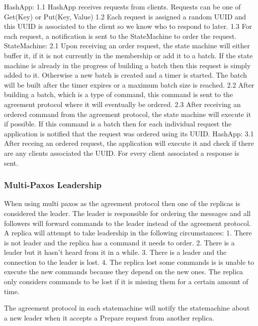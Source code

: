 \documentclass[sigconf]{acmart}
\begin{document}
HashApp:
1.1 HashApp receives requests from clients.
    Requests can be one of Get(Key) or Put(Key, Value)
1.2 Each request is assigned a random UUID and this UUID is associated to the client so we know who to respond to later.
1.3 For each request, a notification is sent to the StateMachine to order the request.
StateMachine:
2.1 Upon receiving an order request, the state machine will either buffer it, if it is not currently in the membership or add it to a batch.
    If the state machine is already in the progress of building a batch then this request is simply added to it.
    Otherwise a new batch is created and a timer is started. The batch will be built after the timer expires or a maximum batch size is reached.
2.2 After building a batch, which is a type of command, this command is sent to the agreement protocol where it will eventually be ordered.
2.3 After receiving an ordered command from the agreement protocol, the state machine will execute it if possible.
    If this command is a batch then for each individual request the application is notified that the request was ordered using its UUID.
HashApp:
3.1 After receing an ordered request, the application will execute it and check if there are any clients associated the UUID.
    For every client associated a response is sent.

\subsubsection{Multi-Paxos Leadership} %


When using multi paxos as the agreement protocol then one of the replicas is considered the leader.
The leader is responsible for ordering the messages and all followers will forward commands to the leader
instead of the agreement protocol.
A replica will attempt to take leadership in the following circumstances:
1. There is not leader and the replica has a command it needs to order.
2. There is a leader but it hasn't heard from it in a while.
3. There is a leader and the connection to the leader is lost.
4. The replica lost some commands is is unable to execute the new commands
    because they depend on the new ones. The replica only considers commands
    to be lost if it is missing them for a certain amount of time.

The agreement protocol in each statemachine will notify the statemachine about a new leader
when it accepts a Prepare request from another replica.
\end{document}
